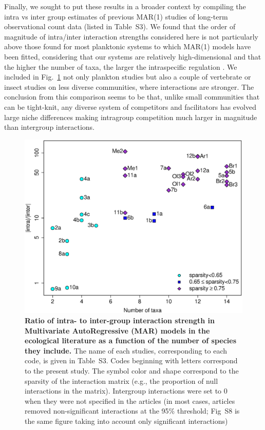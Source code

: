 \documentclass[10pt]{article}
\begin{document}
Finally, we sought to put these results in a broader context by compiling
the intra vs inter group estimates of previous MAR(1) studies of long-term
observational count data (listed in Table~S3). We found
that the order of magnitude of intra/inter interaction strengths considered
here is not particularly above those found for most planktonic systems
to which MAR(1) models have been fitted, considering that our systems
are relatively high-dimensional and that the higher the number of
taxa, the larger the intraspecific regulation \citep{barabas_self-regulation_2017}.
We included in Fig.~\ref{fig:meta_ratio} not only plankton studies
but also a couple of vertebrate or insect studies on less diverse
communities, where interactions are stronger. The conclusion from
this comparison seems to be that, unlike small communities that can
be tight-knit, any diverse system of competitors and facilitators
has evolved large niche differences making intragroup competition
much larger in magnitude than intergroup interactions.

\begin{figure}[!h]
\centering
\includegraphics[width=0.8\linewidth]{Ratio_function_dim}
\caption{\textbf{Ratio of intra- to inter-group interaction strength in Multivariate
AutoRegressive (MAR) models in the ecological literature as a function
of the number of species they include.} The name of each studies,
corresponding to each code, is given in Table~S3. Codes
beginning with letters correspond to the present study. The symbol
color and shape correspond to the sparsity of the interaction matrix
(e.g., the proportion of null interactions in the matrix). Intergroup
interactions were set to 0 when they were not specified in the articles
(in most cases, articles removed non-significant interactions at the
95\% threshold; Fig~S8 is the same figure taking into account only significant interactions)} 
\label{fig:meta_ratio}
\end{figure}
\end{document}
